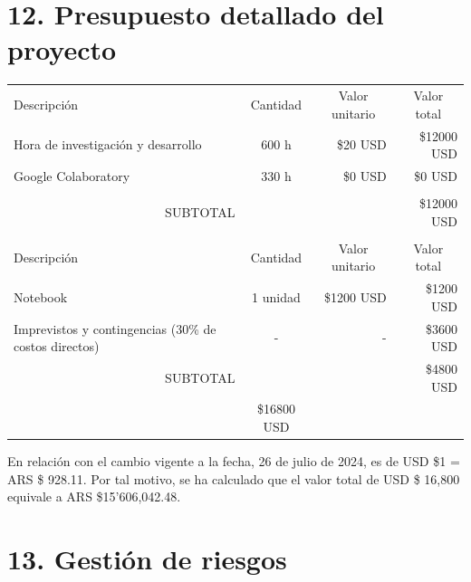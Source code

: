 \documentclass[
11pt, %
codirector, %
]{charter}
\begin{document}
\section{12. Presupuesto detallado del proyecto}
\label{sec:presupuesto}

\begin{table}[htpb]
\centering
\begin{tabularx}{\linewidth}{@{}|X|c|r|r|@{}}
\hline
\rowcolor[HTML]{C0C0C0} 
\multicolumn{4}{|c|}{\cellcolor[HTML]{C0C0C0}COSTOS DIRECTOS} \\ \hline
\rowcolor[HTML]{C0C0C0} 
Descripción &
  \multicolumn{1}{c|}{\cellcolor[HTML]{C0C0C0}Cantidad} &
  \multicolumn{1}{c|}{\cellcolor[HTML]{C0C0C0}Valor unitario} &
  \multicolumn{1}{c|}{\cellcolor[HTML]{C0C0C0}Valor total} \\ \hline
Hora de investigación y desarrollo &
  600 h &
  \$20 USD &
  \$12000 USD \\ \hline
Google Colaboratory &
  330 h &
  \$0 USD &
  \$0 USD \\ \hline
 &
  \multicolumn{1}{c|}{} &
  \multicolumn{1}{c|}{} &
  \multicolumn{1}{c|}{} \\ \hline
\multicolumn{3}{|c|}{SUBTOTAL} &
  \$12000 USD \\ \hline
\rowcolor[HTML]{C0C0C0} 
\multicolumn{4}{|c|}{\cellcolor[HTML]{C0C0C0}COSTOS INDIRECTOS} \\ \hline
\rowcolor[HTML]{C0C0C0} 
Descripción &
  \multicolumn{1}{c|}{\cellcolor[HTML]{C0C0C0}Cantidad} &
  \multicolumn{1}{c|}{\cellcolor[HTML]{C0C0C0}Valor unitario} &
  \multicolumn{1}{c|}{\cellcolor[HTML]{C0C0C0}Valor total} \\ \hline
Notebook &
  1 unidad &
  \$1200 USD &
  \$1200 USD \\ \hline
Imprevistos y contingencias (30\% de costos directos) &
  - &
  - &
  \$3600 USD \\ \hline
\multicolumn{3}{|c|}{SUBTOTAL} &
  \$4800 USD \\ \hline
\rowcolor[HTML]{C0C0C0}
\multicolumn{3}{|c|}{TOTAL} &
  \$16800 USD \\ \hline
\end{tabularx}%
\end{table}

En relación con el cambio vigente a la fecha, 26 de julio de 2024, es de USD \$1 = ARS \$ 928.11. Por tal motivo, se ha calculado que el valor total de USD \$ 16,800 equivale a ARS \$15'606,042.48. 

\section{13. Gestión de riesgos}
\label{sec:riesgos}
\end{document}
